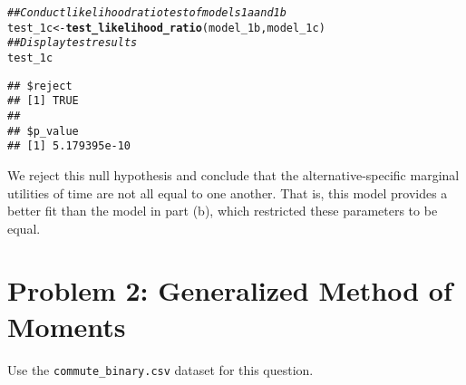 \documentclass[11pt,letterpaper]{article}\usepackage[]{graphicx}\usepackage[]{color}
\makeatletter
\newcommand{\hlcom}[1]{\textcolor[rgb]{0.678,0.584,0.686}{\textit{#1}}}%
\newcommand{\hlstd}[1]{\textcolor[rgb]{0.345,0.345,0.345}{#1}}%
\newcommand{\hlkwb}[1]{\textcolor[rgb]{0.69,0.353,0.396}{#1}}%
\newcommand{\hlkwd}[1]{\textcolor[rgb]{0.737,0.353,0.396}{\textbf{#1}}}%
\newenvironment{kframe}{%
 \def\at@end@of@kframe{}%
 \ifinner\ifhmode%
  \def\at@end@of@kframe{\end{minipage}}%
  \begin{minipage}{\columnwidth}%
 \fi\fi%
 \def\FrameCommand##1{\hskip\@totalleftmargin \hskip-\fboxsep
 \colorbox{shadecolor}{##1}\hskip-\fboxsep
     \hskip-\linewidth \hskip-\@totalleftmargin \hskip\columnwidth}%
 \MakeFramed {\advance\hsize-\width
   \@totalleftmargin\z@ \linewidth\hsize
   \@setminipage}}%
 {\par\unskip\endMakeFramed%
 \at@end@of@kframe}
\newenvironment{knitrout}{}{} %
\makeatother
\begin{document}
\begin{enumerate}[label=\alph*., leftmargin=*]
\begin{enumerate}[label=\roman*.]
\begin{knitrout}
\color{fgcolor}\begin{kframe}
\begin{alltt}
\hlcom{## Conduct likelihood ratio test of models 1a and 1b}
\hlstd{test_1c} \hlkwb{<-} \hlkwd{test_likelihood_ratio}\hlstd{(model_1b, model_1c)}
\hlcom{## Display test results}
\hlstd{test_1c}
\end{alltt}
\begin{verbatim}
## $reject
## [1] TRUE
## 
## $p_value
## [1] 5.179395e-10
\end{verbatim}
\end{kframe}
\end{knitrout}

		We reject this null hypothesis and conclude that the alternative-specific marginal utilities of time are not all equal to one another. That is, this model provides a better fit than the model in part (b), which restricted these parameters to be equal.
	\end{enumerate}
\end{enumerate}

\section*{Problem 2: Generalized Method of Moments}

Use the \texttt{commute\_binary.csv} dataset for this question.
\end{document}
